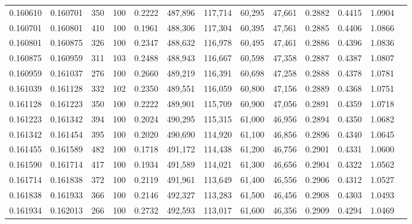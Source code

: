 \begin{tabular}{rrrrrrrrrrrrr}
0.160610 & 0.160701 &   350 & 100 &                                     0.2222 & 487,896 & 117,714 &  60,295 &  47,661 & 0.2882 & 0.4415 & 1.0904 \\
0.160701 & 0.160801 &   410 & 100 &                                     0.1961 & 488,306 & 117,304 &  60,395 &  47,561 & 0.2885 & 0.4406 & 1.0866 \\
0.160801 & 0.160875 &   326 & 100 &                                     0.2347 & 488,632 & 116,978 &  60,495 &  47,461 & 0.2886 & 0.4396 & 1.0836 \\
0.160875 & 0.160959 &   311 & 103 &                                     0.2488 & 488,943 & 116,667 &  60,598 &  47,358 & 0.2887 & 0.4387 & 1.0807 \\
0.160959 & 0.161037 &   276 & 100 &                                     0.2660 & 489,219 & 116,391 &  60,698 &  47,258 & 0.2888 & 0.4378 & 1.0781 \\
0.161039 & 0.161128 &   332 & 102 &                                     0.2350 & 489,551 & 116,059 &  60,800 &  47,156 & 0.2889 & 0.4368 & 1.0751 \\
0.161128 & 0.161223 &   350 & 100 &                                     0.2222 & 489,901 & 115,709 &  60,900 &  47,056 & 0.2891 & 0.4359 & 1.0718 \\
0.161223 & 0.161342 &   394 & 100 &                                     0.2024 & 490,295 & 115,315 &  61,000 &  46,956 & 0.2894 & 0.4350 & 1.0682 \\
0.161342 & 0.161454 &   395 & 100 &                                     0.2020 & 490,690 & 114,920 &  61,100 &  46,856 & 0.2896 & 0.4340 & 1.0645 \\
0.161455 & 0.161589 &   482 & 100 &                                     0.1718 & 491,172 & 114,438 &  61,200 &  46,756 & 0.2901 & 0.4331 & 1.0600 \\
0.161590 & 0.161714 &   417 & 100 &                                     0.1934 & 491,589 & 114,021 &  61,300 &  46,656 & 0.2904 & 0.4322 & 1.0562 \\
0.161714 & 0.161838 &   372 & 100 &                                     0.2119 & 491,961 & 113,649 &  61,400 &  46,556 & 0.2906 & 0.4312 & 1.0527 \\
0.161838 & 0.161933 &   366 & 100 &                                     0.2146 & 492,327 & 113,283 &  61,500 &  46,456 & 0.2908 & 0.4303 & 1.0493 \\
0.161934 & 0.162013 &   266 & 100 &                                     0.2732 & 492,593 & 113,017 &  61,600 &  46,356 & 0.2909 & 0.4294 & 1.0469 \\

\end{tabular}
